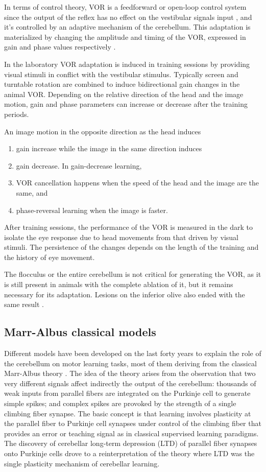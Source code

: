 \documentclass[12pt, a4paper,twoside]{tesi_upf}
\begin{document}
In terms of control theory, VOR is a feedforward or open-loop control system since the output of the reflex has no effect on the vestibular signals input \cite{Porrill2007}, and it's controlled by an adaptive mechanism of the cerebellum. This adaptation is materialized by changing the amplitude and timing of the VOR, expressed in gain and phase values respectively \cite{DeZeeuw2005}.

In the laboratory VOR adaptation is induced in training sessions by providing visual stimuli in conflict with the vestibular stimulus. Typically screen and turntable rotation are combined to induce bidirectional gain changes in the animal VOR. Depending on the relative direction of the head and the image motion, gain and phase parameters can increase or decrease after the training periods.

An image motion in the opposite direction as the head induces
\begin{enumerate}
\item gain increase while the image in the same direction induces
\item gain decrease. In gain-decrease learning,
\item VOR cancellation happens when the speed of the head and the image are the same, and
\item phase-reversal learning when the image is faster.
\end{enumerate}

After training sessions, the performance of the VOR is measured in the dark to isolate the eye response due to head movements from that driven by visual stimuli. The persistence of the changes depends on the length of the training and the history of eye movement.

The flocculus or the entire cerebellum is not critical for generating the VOR, as it is still present in animals with the complete ablation of it, but it remains necessary for its adaptation. Lesions on the inferior olive also ended with the same result \cite{Ito2006}.

\subsection{Marr-Albus classical models}

Different models have been developed on the last forty years to explain the role of the cerebellum on motor learning tasks, most of them deriving from the classical Marr-Albus theory \cite{Marr1969,Albus1971}. The idea of the theory arises from the observation that two very different signals affect indirectly the output of the cerebellum: thousands of weak inputs from parallel fibers are integrated on the Purkinje cell to generate simple spikes; and complex spikes are provoked by the strength of a single climbing fiber synapse. The basic concept is that learning involves plasticity at the parallel fiber to Purkinje cell synapses under control of the climbing fiber that provides an error or teaching signal as in classical supervised learning paradigms. The discovery of cerebellar long-term depression (LTD) of parallel fiber synapses onto Purkinje cells \cite{Ito1982} drove to a reinterpretation of the theory where LTD was the single plasticity mechanism of cerebellar learning.
\end{document}
